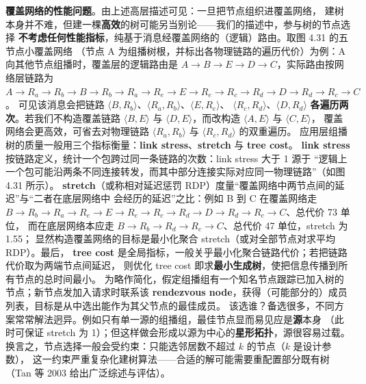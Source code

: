 \medskip\noindent\textbf{覆盖网络的性能问题}。由上述高层描述可见：一旦把节点组织进覆盖网络，
建树本身并不难，但建一棵\textbf{高效}的树可能另当别论——我们的描述中，参与树的节点选择
\textbf{不考虑任何性能指标}，纯基于消息经覆盖网络的（逻辑）路由。取图 4.31 的五节点小覆盖网络
（节点 A 为组播树根，并标出各物理链路的遍历代价）为例：A 向其他节点组播时，覆盖层的逻辑路由是
$A\to B\to E\to D\to C$，实际路由按网络层链路为
$A\to R_a\to R_b\to B\to R_b\to R_a\to R_e\to E\to R_e\to R_c\to R_d\to D\to R_d\to R_c\to C$。
可见该消息会把链路 $\langle B,R_b\rangle$、$\langle R_a,R_b\rangle$、$\langle E,R_e\rangle$、
$\langle R_c,R_d\rangle$、$\langle D,R_d\rangle$ \textbf{各遍历两次}。若我们不构造覆盖链路
$\langle B,E\rangle$ 与 $\langle D,E\rangle$，而改构造 $\langle A,E\rangle$ 与 $\langle C,E\rangle$，
覆盖网络会更高效，可省去对物理链路 $\langle R_a,R_b\rangle$ 与 $\langle R_c,R_d\rangle$ 的双重遍历。
应用层组播树的质量一般用三个指标衡量：\textbf{link stress}、\textbf{stretch} 与 \textbf{tree cost}。
\textbf{link stress} 按链路定义，统计一个包跨过同一条链路的次数：link stress 大于 1 源于
“逻辑上一个包可能沿两条不同连接转发，而其中部分连接实际对应同一物理链路”（如图 4.31 所示）。
\textbf{stretch}（或称相对延迟惩罚 RDP）度量“覆盖网络中两节点间的延迟”与“二者在底层网络中
会经历的延迟”之比：例如 B 到 C 在覆盖网络走
$B\to R_b\to R_a\to R_e\to E\to R_e\to R_c\to R_d\to D\to R_d\to R_c\to C$、总代价 73 单位，
而在底层网络本应走 $B\to R_b\to R_d\to R_c\to C$、总代价 47 单位，stretch 为 1.55；
显然构造覆盖网络的目标是最小化聚合 stretch（或对全部节点对求平均 RDP）。最后，
\textbf{tree cost} 是全局指标，一般关乎最小化聚合链路代价；若把链路代价取为两端节点间延迟，
则优化 tree cost 即求\textbf{最小生成树}，使把信息传播到所有节点的总时间最小。
为略作简化，假定组播组有一个知名节点跟踪已加入树的节点；新节点发加入请求时联系该
\textbf{rendezvous node}，获得（可能部分的）成员列表，目标是从中选出能作为其父节点的最佳成员。
该选谁？备选很多，不同方案常常解法迥异。例如只有单一源的组播组，最佳节点显而易见应是\textbf{源}本身
（此时可保证 stretch 为 1）；但这样做会形成以源为中心的\textbf{星形拓扑}，源很容易过载。
换言之，节点选择一般会受约束：只能选邻居数不超过 $k$ 的节点（$k$ 是设计参数），
这一约束严重复杂化建树算法——合适的解可能需要重配置部分既有树（Tan 等 2003 给出广泛综述与评估）。

\begin{closeread}
\end{closeread}

